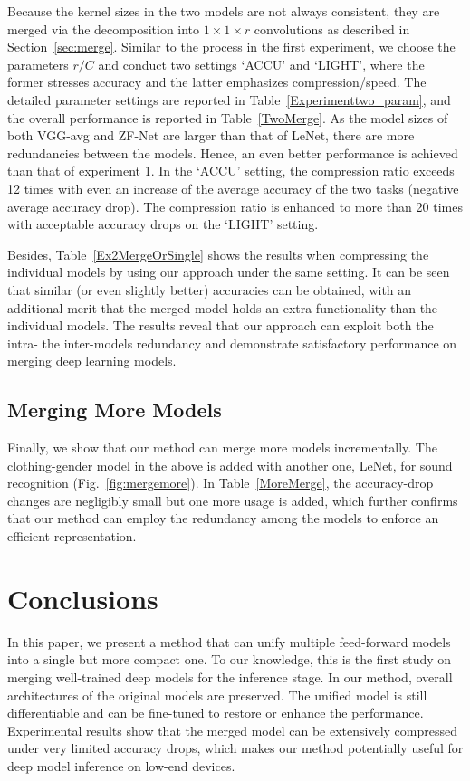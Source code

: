 \documentclass{article}
\begin{document}
	Because the kernel sizes in the two models are not always consistent, they are merged via the decomposition into $1\times 1 \times r$ convolutions as described in Section~\ref{sec:merge}.
	Similar to the process in the first experiment, we choose the parameters $r/C$ and conduct two settings `ACCU' and `LIGHT', where the former stresses accuracy and the latter emphasizes compression/speed. The detailed parameter settings are reported in Table~\ref{Experimenttwo_param}, and the overall performance is reported in Table~\ref{TwoMerge}.
	As the model sizes of both VGG-avg and ZF-Net are larger than that of LeNet, there are more redundancies between the models.
	Hence, an even better performance is achieved than that of experiment 1.
	In the `ACCU' setting, the compression ratio exceeds 12 times with even an increase of the average accuracy of the two tasks (negative average accuracy drop).
	The compression ratio is enhanced to more than 20 times with acceptable accuracy drops on the `LIGHT' setting.
	
	Besides, Table~\ref{Ex2MergeOrSingle} shows the results when compressing the individual models by using our approach under the same setting.
	It can be seen that similar (or even slightly better) accuracies can be obtained, with an additional merit that the merged model holds an extra functionality than the individual models.
	The results reveal that our approach can exploit both the intra- the inter-models redundancy and demonstrate satisfactory performance on merging deep learning models.
	
	
	
	
	
	
	
	
	
	\subsection*{Merging More Models}
	Finally, we show that our method can merge more models incrementally.
	The clothing-gender model in the above is added with another one, LeNet, for sound recognition (Fig.~\ref{fig:mergemore}).
	In Table~\ref{MoreMerge}, the accuracy-drop changes are negligibly small %
	but one more usage is added, which further confirms that our method can employ the redundancy among the models to enforce an efficient representation.
	
	
	
	\section{Conclusions}
	In this paper, we present a method that can unify multiple feed-forward models into a single but more compact one.
	To our knowledge, this is the first study on merging well-trained deep models for the inference stage. In our method, overall architectures of the original models are preserved.
	The unified model is still differentiable and can be fine-tuned to restore or enhance the performance. Experimental results show that the merged model can be extensively compressed under very limited accuracy drops, which makes our method potentially useful for deep model inference on low-end devices.
	
\end{document}
